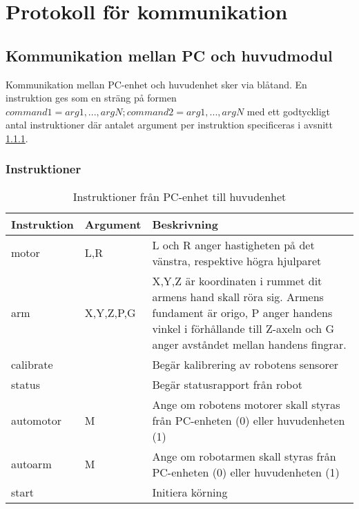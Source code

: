 \section{Protokoll för kommunikation}

\subsection{Kommunikation mellan PC och huvudmodul}

Kommunikation mellan PC-enhet och huvudenhet sker via blåtand. En instruktion ges som en sträng på formen $command1=arg1,...,argN;command2=arg1,...,argN$ med ett godtyckligt antal instruktioner där antalet argument per instruktion specificeras i avsnitt \ref{designspec:protokoll-pc-huvud-kommandon}.

\subsubsection{Instruktioner} \label{designspec:protokoll-pc-huvud-kommandon}

\begin{table}[h]
	\centering
		\begin{tabularx}{\textwidth}{| l | l | X |}
			\hline
			\textbf{Instruktion} & \textbf{Argument} & \textbf{Beskrivning} \\
			\hline
			{motor} & {L,R} & {L och R anger hastigheten på det vänstra, respektive högra hjulparet} \\
			\hline
			{arm} & {X,Y,Z,P,G} & {X,Y,Z är koordinaten i rummet dit armens hand skall röra sig. Armens fundament är origo, P anger handens vinkel i förhållande till Z-axeln och G anger avståndet mellan handens fingrar.} \\
			\hline
			{calibrate} & {} & {Begär kalibrering av robotens sensorer} \\
			\hline
			{status} & {} & {Begär statusrapport från robot \todo{Format på svar?}} \\
			\hline
			{automotor} & {M} & {Ange om robotens motorer skall styras från PC-enheten (0) eller huvudenheten (1)} \\
			\hline
			{autoarm} & {M} & {Ange om robotarmen skall styras från PC-enheten (0) eller huvudenheten (1)} \\
			\hline
			{start} & {} & {Initiera körning} \\
			\hline
		\end{tabularx}
	\caption{Instruktioner från PC-enhet till huvudenhet} \label{protokoll:pc-huvud}
\end{table}
\\

